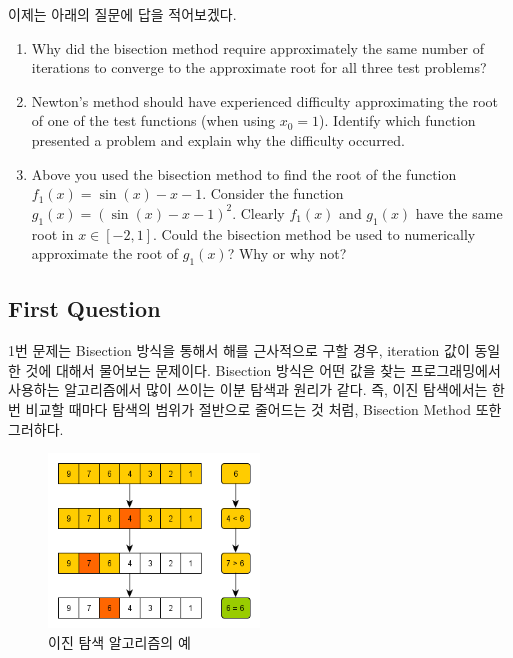 \documentclass[11pt]{article}
\begin{document}
이제는 아래의 질문에 답을 적어보겠다.
\vspace{2mm}
\begin{enumerate}
\item Why did the bisection method require approximately the same number of iterations to converge to the approximate root for all three test problems?
\item Newton’s method should have experienced difficulty approximating the root of one of the test functions (when using 
$x_0 = 1$). Identify which function presented a problem and explain why the difficulty occurred.
\item  Above you used the bisection method to find the root of the function $f_1(x) = \sin(x) -  x - 1$. Consider the function $g_1(x) =( \sin(x) - x - 1 )^2$. Clearly $f_1(x)$ and $g_1(x)$ have the same root in $x \in [-2, 1]$. Could the bisection method be used to numerically approximate the root of $g_1(x)$? Why or why not?
\end{enumerate}
\vspace{2mm}

\subsection{First Question} 
\noindent  
1번 문제는 Bisection 방식을 통해서 해를 근사적으로 구할 경우, iteration 값이 동일 한 것에 대해서 물어보는 문제이다. Bisection 방식은 어떤 값을 찾는 프로그래밍에서 사용하는 알고리즘에서 많이 쓰이는 이분 탐색과 원리가 같다. 즉, 이진 탐색에서는 한 번 비교할 때마다 탐색의 범위가 절반으로 줄어드는 것 처럼, Bisection Method 또한 그러하다. 
\begin{figure}[!ht]
  \centering
  \includegraphics[width=0.5\textwidth]{Bisection_method.png}
  \caption{이진 탐색 알고리즘의 예}
\end{figure}
\end{document}
